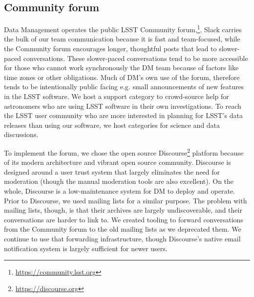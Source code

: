 \subsection{Community forum}
\label{sec:forum}

Data Management operates the public LSST Community forum,\footnote{\url{https://community.lsst.org}}.
Slack carries the bulk of our team communication because it is fast and team-focused, while
the Community forum  encourages longer, thoughtful posts that lead to slower-paced conversations.
These slower-paced conversations tend to be more accessible for those who cannot work synchronously the DM team because of factors like time zones or other obligations.
Much of DM's own use of the forum, therefore tends to be intentionally public facing e.g.
small announcements of new features in the LSST software.
We host a support category to crowd-source help for astronomers who are using LSST software in their own investigations.
To reach the LSST user community who are more interested in planning for LSST's data releases than using our software, we host categories for science and data discussions.

\noindent To implement the forum, we chose the open source Discourse\footnote{\url{https://discourse.org}} platform because of its modern architecture and vibrant open source community.
Discourse is designed around a user trust system that largely eliminates the need for moderation (though the manual moderation tools are also excellent).
On the whole, Discourse is a low-maintenance system for DM to deploy and operate.
Prior to Discourse, we used mailing lists for a similar purpose.
The problem with mailing lists, though, is that their archives are largely undiscoverable, and their conversations are harder to link to.
We created tooling to forward conversations from the Community forum to the old mailing lists as we deprecated them.
We continue to use that forwarding infrastructure, though Discourse's native email notification system is largely sufficient for newer users.
